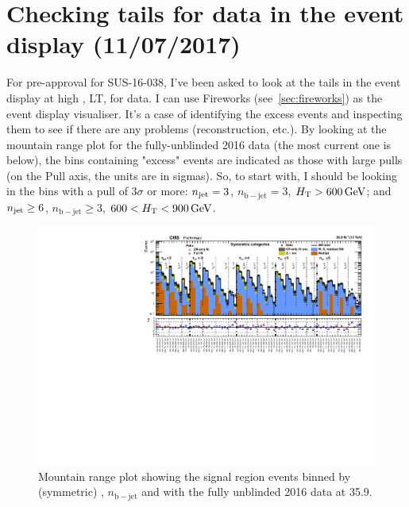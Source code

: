 
\chapter{Checking \texorpdfstring{\htmiss}{HTmiss} tails for data in the event display (11/07/2017)}

For pre-approval for SUS-16-038, I've been asked to look at the \htmiss tails in the event display at high \HT, LT, for data. I can use Fireworks (see~\ref{sec:fireworks}) as the event display visualiser. It's a case of identifying the excess events and inspecting them to see if there are any problems (reconstruction, etc.). By looking at the mountain range plot for the fully-unblinded 2016 data (the most current one is below), the bins containing "excess" events are indicated as those with large pulls (on the Pull axis, the units are in sigmas). So, to start with, I should be looking in the bins with a pull of 3$\sigma$ or more: $n_{\mathrm{jet}} = 3$, $n_{\mathrm{b-jet}} = 3$, $H_{\mathrm{T}} > 600\,\text{G\text{e\kern-0.15ex V}}$; and $n_{\mathrm{jet}} \geq 6$, $n_{\mathrm{b-jet}} \geq 3$, $600 < H_{\mathrm{T}} < 900\,\text{G\text{e\kern-0.15ex V}}$.

\begin{figure}[htbp]
\centering
\includegraphics[width=\textwidth]{./sec27/summaryPlot_Symmetric_prefit_overlay_fit_b.pdf}
\caption{Mountain range plot showing the signal region events binned by (symmetric) \njet, $n_{\mathrm{b-jet}}$ and \HT with the fully unblinded 2016 data at 35.9\fbinv. }
\end{figure}

